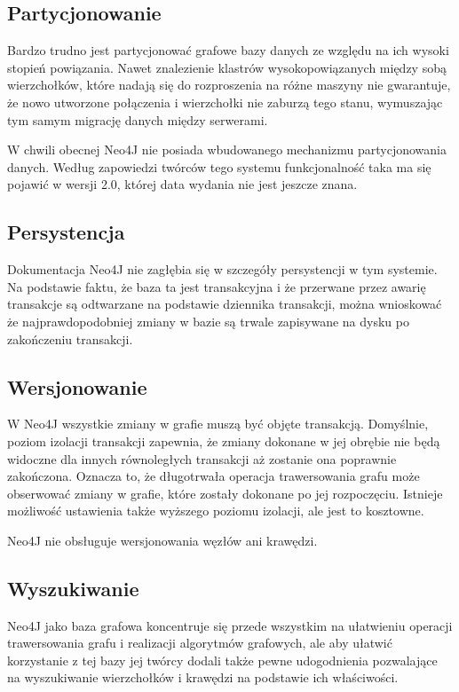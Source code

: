 \subsection*{Partycjonowanie}

Bardzo trudno jest partycjonować grafowe bazy danych ze względu na ich wysoki stopień powiązania.
Nawet znalezienie klastrów wysokopowiązanych między sobą wierzchołków, które nadają się do rozproszenia na różne maszyny nie gwarantuje, że nowo utworzone połączenia i wierzchołki nie zaburzą tego stanu, wymuszając tym samym migrację danych między serwerami.

W chwili obecnej Neo4J nie posiada wbudowanego mechanizmu partycjonowania danych.
Według zapowiedzi twórców tego systemu funkcjonalność taka ma się pojawić w wersji 2.0, której data wydania nie jest jeszcze znana.

\subsection*{Persystencja}

Dokumentacja Neo4J nie zagłębia się w szczegóły persystencji w tym systemie.
Na podstawie faktu, że baza ta jest transakcyjna i że przerwane przez awarię transakcje są odtwarzane na podstawie dziennika transakcji, można wnioskować że najprawdopodobniej zmiany w bazie są trwale zapisywane na dysku po zakończeniu transakcji.

\subsection*{Wersjonowanie}

W Neo4J wszystkie zmiany w grafie muszą być objęte transakcją.
Domyślnie, poziom izolacji transakcji zapewnia, że zmiany dokonane w jej obrębie nie będą widoczne dla innych równoległych transakcji aż zostanie ona poprawnie zakończona.
Oznacza to, że długotrwała operacja trawersowania grafu może obserwować zmiany w grafie, które zostały dokonane po jej rozpoczęciu.
Istnieje możliwość ustawienia także wyższego poziomu izolacji, ale jest to kosztowne.

Neo4J nie obsługuje wersjonowania węzłów ani krawędzi.

\subsection*{Wyszukiwanie}

Neo4J jako baza grafowa koncentruje się przede wszystkim na ułatwieniu operacji trawersowania grafu i realizacji algorytmów grafowych, ale aby ułatwić korzystanie z tej bazy jej twórcy dodali także pewne udogodnienia pozwalające na wyszukiwanie wierzchołków i krawędzi na podstawie ich właściwości.

